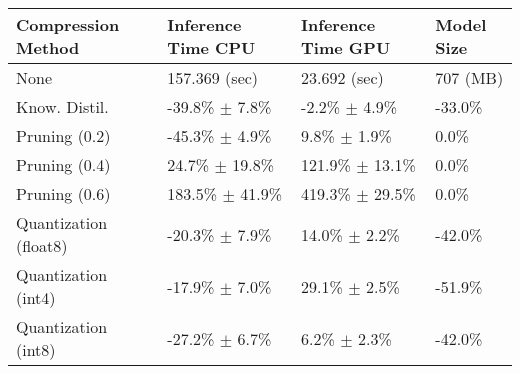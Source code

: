 \begin{tabular}{llll}
\toprule
\textbf{Compression Method} & \textbf{Inference Time CPU} & \textbf{Inference Time GPU} & \textbf{Model Size} \\
\midrule
None & 157.369 (sec) & 23.692 (sec) & 707 (MB) \\
Know. Distil. & -39.8\% $\pm$ 7.8\% & -2.2\% $\pm$ 4.9\% & -33.0\% \\
Pruning (0.2) & -45.3\% $\pm$ 4.9\% & 9.8\% $\pm$ 1.9\% & 0.0\% \\
Pruning (0.4) & 24.7\% $\pm$ 19.8\% & 121.9\% $\pm$ 13.1\% & 0.0\% \\
Pruning (0.6) & 183.5\% $\pm$ 41.9\% & 419.3\% $\pm$ 29.5\% & 0.0\% \\
Quantization (float8) & -20.3\% $\pm$ 7.9\% & 14.0\% $\pm$ 2.2\% & -42.0\% \\
Quantization (int4) & -17.9\% $\pm$ 7.0\% & 29.1\% $\pm$ 2.5\% & -51.9\% \\
Quantization (int8) & -27.2\% $\pm$ 6.7\% & 6.2\% $\pm$ 2.3\% & -42.0\% \\
\bottomrule
\end{tabular}
